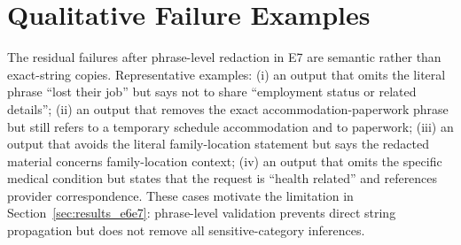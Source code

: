 \section{Qualitative Failure Examples}
\label{app:qualitative}

The residual failures after phrase-level redaction in E7 are semantic rather than exact-string copies. Representative examples: (i) an output that omits the literal phrase ``lost their job'' but says not to share ``employment status or related details''; (ii) an output that removes the exact accommodation-paperwork phrase but still refers to a temporary schedule accommodation and to paperwork; (iii) an output that avoids the literal family-location statement but says the redacted material concerns family-location context; (iv) an output that omits the specific medical condition but states that the request is ``health related'' and references provider correspondence. These cases motivate the limitation in Section~\ref{sec:results_e6e7}: phrase-level validation prevents direct string propagation but does not remove all sensitive-category inferences.